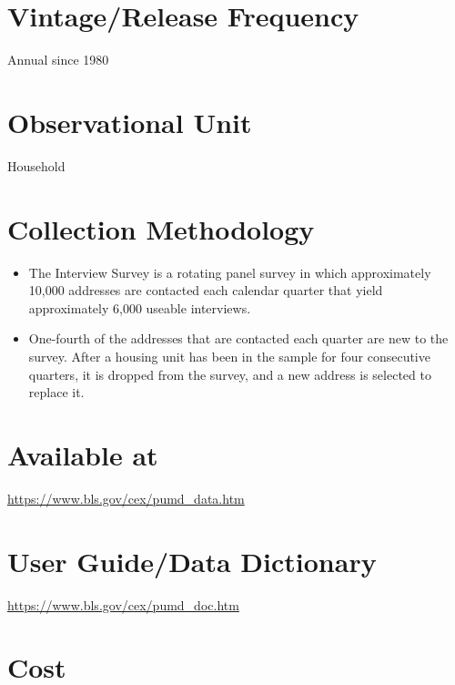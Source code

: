 \documentclass[
]{book}
\providecommand{\tightlist}{%
  \setlength{\itemsep}{0pt}\setlength{\parskip}{0pt}}
\begin{document}
\hypertarget{vintagerelease-frequency-19}{%
\section{Vintage/Release Frequency}\label{vintagerelease-frequency-19}}

Annual since 1980

\hypertarget{observational-unit-19}{%
\section{Observational Unit}\label{observational-unit-19}}

Household

\hypertarget{collection-methodology-19}{%
\section{Collection Methodology}\label{collection-methodology-19}}

\begin{itemize}
\tightlist
\item
  The Interview Survey is a rotating panel survey in which approximately 10,000 addresses are contacted each calendar quarter that yield approximately 6,000 useable interviews.
\item
  One-fourth of the addresses that are contacted each quarter are new to the survey. After a housing unit has been in the sample for four consecutive quarters, it is dropped from the survey, and a new address is selected to replace it.
\end{itemize}

\hypertarget{available-at-19}{%
\section{Available at}\label{available-at-19}}

\url{https://www.bls.gov/cex/pumd_data.htm}

\hypertarget{user-guidedata-dictionary-19}{%
\section{User Guide/Data Dictionary}\label{user-guidedata-dictionary-19}}

\url{https://www.bls.gov/cex/pumd_doc.htm}

\hypertarget{cost-19}{%
\section{Cost}\label{cost-19}}
\end{document}
